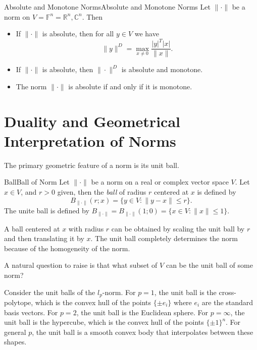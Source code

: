 \documentclass[../main.tex]{subfiles}
\begin{document}
\begin{theorem}{Absolute and Monotone Norms}{Absolute and Monotone Norms}
  Let $\|\cdot\|$ be a norm on $V = \mathbb{F}^n = \mathbb{R}^n, \mathbb{C}^n$. Then
  \begin{itemize}
    \item If $\|\cdot\|$ is absolute, then for all $y\in V$ we have
      \begin{equation}
        \|y\|^D = \max_{x \neq 0} \frac{|y|^T |x|}{\|x\|}.
      \end{equation}
    \item If $\|\cdot\|$ is absolute, then $\|\cdot\|^D$ is absolute and monotone.
    \item The norm $\|\cdot\|$ is absolute if and only if it is monotone.
  \end{itemize}
\end{theorem}

\section{Duality and Geometrical Interpretation of Norms}
The primary geometric feature of a norm is its unit ball.

\begin{definition}{Ball}{Ball of Norm}
  Let $\|\cdot\|$ be a norm on a real or complex vector space $V$. Let $x\in V$, and $r > 0$ given, then the \textit{ball} of radius $r$ centered at $x$ is defined by
  \begin{equation}
    B_{\|\cdot\|}(r;x) = \{y \in V: \|y - x\| \leq r\}.
  \end{equation}
  The unite ball is defined by $B_{\|\cdot\|} = B_{\|\cdot\|}(1;0) = \{x \in V: \|x\| \leq 1\}$.
\end{definition}
\begin{remark}
  A ball centered at $x$ with radius $r$ can be obtained by scaling the unit ball by $r$ and then translating it by $x$. The unit ball completely determines the norm because of the homogeneity of the norm.
\end{remark}

A natural question to raise is that what subset of $V$ can be the unit ball of some norm?

Consider the unit balls of the $l_p$-norm. For $p = 1$, the unit ball is the cross-polytope, which is the convex hull of the points $\{\pm e_i\}$ where $e_i$ are the standard basis vectors. For $p = 2$, the unit ball is the Euclidean sphere. For $p = \infty$, the unit ball is the hypercube, which is the convex hull of the points $\{\pm 1\}^n$. For general $p$, the unit ball is a smooth convex body that interpolates between these shapes.
\end{document}
